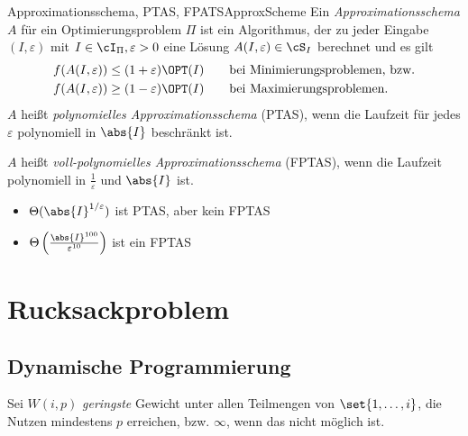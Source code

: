 \documentclass[language=ngerman,algolist]{TemplateLecture}
\begin{document}
\begin{defi}{Approximationsschema, PTAS, FPATS}{ApproxScheme}
    Ein \emph{Approximationsschema} $A$ für ein Optimierungsproblem $\Pi$ ist ein Algorithmus, der zu jeder Eingabe $(I, \varepsilon)$ mit $I \in \cI_\Pi, \varepsilon > 0$ eine Lösung $A(I, \varepsilon) \in \cS_I$ berechnet und es gilt 
    \begin{equation*}
        \begin{split}
            f(A(I,\varepsilon)) &\leq (1+\varepsilon)\OPT(I) \quad \quad \text{bei Minimierungsproblemen, bzw.} \\ 
            f(A(I,\varepsilon)) &\geq (1-\varepsilon)\OPT(I) \quad \quad \text{bei Maximierungsproblemen.}
        \end{split}
    \end{equation*}
    $A$ heißt \emph{polynomielles Approximationsschema} (PTAS), wenn die Laufzeit für jedes $\varepsilon$ polynomiell in $\abs{I}$ beschränkt ist.

    $A$ heißt \emph{voll-polynomielles Approximationsschema} (FPTAS), wenn die Laufzeit polynomiell in $\frac{1}{\varepsilon}$ und $\abs{I}$ ist.
\end{defi}

\begin{expl}\leavevmode
    \begin{itemize}
        \item $\Theta(\abs{I}^{1/\varepsilon})$ ist PTAS, aber kein FPTAS
        \item $\Theta\left( \frac{\abs{I}^{100}}{\varepsilon^{10}} \right)$ ist ein FPTAS
    \end{itemize}
\end{expl}

\section{Rucksackproblem}

\subsection{Dynamische Programmierung}

Sei $W(i,p)$ \emph{geringste} Gewicht unter allen Teilmengen von $\set{1,\ldots,i}$, die Nutzen mindestens $p$ erreichen, bzw. $\infty$, wenn das nicht möglich ist.
\end{document}
